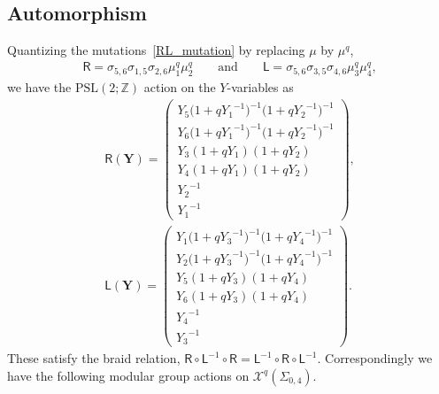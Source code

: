 \documentclass[10pt,a4paper]{amsart}
\numberwithin{equation}{section}
\begin{document}
\subsection*{Automorphism}
Quantizing the mutations~\eqref{RL_mutation} by replacing $\mu$ by $\mu^q$,
\begin{gather*}
\mathsf{R}= \sigma_{5,6} \sigma_{1,5} \sigma_{2,6} \mu^q_1 \mu^q_2 \qquad \text{and} \qquad \mathsf{L}=\sigma_{5,6} \sigma_{3,5} \sigma_{4,6} \mu^q_3 \mu^q_4,
\end{gather*} we have the $\mathrm{PSL}(2;\mathbb{Z})$ action on the $Y$-variables as
\begin{gather*}
 \mathsf{R}(\boldsymbol{Y}) =
 \begin{pmatrix}
 Y_5 \big( 1+q {Y_1}^{-1} \big)^{-1} \big( 1+q {Y_2}^{-1} \big)^{-1} \\
 Y_6 \big( 1+q {Y_1}^{-1} \big)^{-1} \big( 1+q {Y_2}^{-1} \big)^{-1} \\
 Y_3 ( 1+q Y_1 ) (1+q Y_2) \\
 Y_4 ( 1+q Y_1) ( 1+q Y_2) \\
 {Y_2}^{-1} \\
 {Y_1}^{-1}
 \end{pmatrix} , \\
 \mathsf{L}(\boldsymbol{Y}) =
 \begin{pmatrix}
 Y_1 \big( 1+q {Y_3}^{-1} \big)^{-1} \big( 1+q {Y_4}^{-1}\big)^{-1} \\
 Y_2 \big( 1+q {Y_3}^{-1} \big)^{-1} \big( 1+q {Y_4}^{-1} \big)^{-1} \\
 Y_5 ( 1+q Y_3)( 1+q Y_4) \\
 Y_6 ( 1+q Y_3)( 1+q Y_4) \\
 {Y_4}^{-1} \\
 {Y_3}^{-1}
 \end{pmatrix} .
\end{gather*}
These satisfy the braid relation, $\mathsf{R} \circ \mathsf{L}^{-1} \circ \mathsf{R} = \mathsf{L}^{-1} \circ \mathsf{R} \circ \mathsf{L}^{-1}$. Correspondingly we have the following modular group actions on $\mathcal{X}^q(\Sigma_{0,4})$.
\end{document}
